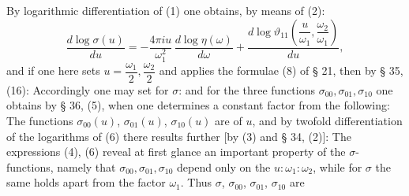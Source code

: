 
By logarithmic differentiation of (1) one obtains, by means of (2):
\[
\frac{d\log\sigma(u)}{du} = -\frac{4\pi i u}{\omega_1^2}\,\frac{d\log\eta(\omega)}{d\omega} + \frac{d\log\vartheta_{11}\left(\dfrac{u}{\omega_1},\dfrac{\omega_2}{\omega_1}\right)}{du},
\]
and if one here sets $u = \dfrac{\omega_1}{2}, \dfrac{\omega_2}{2}$ and applies the formulae (8) of § 21, then by § 35, (16):
Accordingly one may set for $\sigma$:
and for the three functions $\sigma_{00}, \sigma_{01}, \sigma_{10}$ one obtains by § 36, (5), when one determines a constant factor from
the following:
The functions $\sigma_{00}(u)$, $\sigma_{01}(u)$, $\sigma_{10}(u)$ are  of $u$, and by twofold differentiation of the logarithms of (6) there results further [by (3) and § 34, (2)]:
The expressions (4), (6) reveal at first glance an important property of the $\sigma$-functions, namely that $\sigma_{00}, \sigma_{01}, \sigma_{10}$ depend only on the  $u:\omega_1:\omega_2$, while for $\sigma$ the same holds apart from the factor $\omega_1$. Thus $\sigma$, $\sigma_{00}$, $\sigma_{01}$, $\sigma_{10}$ are 
